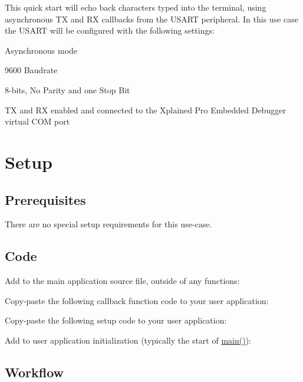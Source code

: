 This quick start will echo back characters typed into the terminal, using asynchronous TX and RX callbacks from the U\+S\+A\+RT peripheral. In this use case the U\+S\+A\+RT will be configured with the following settings\+:
\begin{DoxyItemize}
\item Asynchronous mode
\item 9600 Baudrate
\item 8-\/bits, No Parity and one Stop Bit
\item TX and RX enabled and connected to the Xplained Pro Embedded Debugger virtual C\+OM port
\end{DoxyItemize}\hypertarget{asfdoc_sam0_sercom_usart_callback_use_case_asfdoc_sam0_sercom_usart_callback_use_case_setup}{}\section{Setup}\label{asfdoc_sam0_sercom_usart_callback_use_case_asfdoc_sam0_sercom_usart_callback_use_case_setup}
\hypertarget{asfdoc_sam0_sercom_usart_callback_use_case_asfdoc_sam0_sercom_usart_callback_use_case_prereq}{}\subsection{Prerequisites}\label{asfdoc_sam0_sercom_usart_callback_use_case_asfdoc_sam0_sercom_usart_callback_use_case_prereq}
There are no special setup requirements for this use-\/case.\hypertarget{asfdoc_sam0_sercom_usart_callback_use_case_asfdoc_sam0_usart_callback_use_case_setup_code}{}\subsection{Code}\label{asfdoc_sam0_sercom_usart_callback_use_case_asfdoc_sam0_usart_callback_use_case_setup_code}
Add to the main application source file, outside of any functions\+: 
\begin{DoxyCodeInclude}{0}
\end{DoxyCodeInclude}

\begin{DoxyCodeInclude}{0}
\end{DoxyCodeInclude}
 Copy-\/paste the following callback function code to your user application\+: 
\begin{DoxyCodeInclude}{0}
\end{DoxyCodeInclude}
 Copy-\/paste the following setup code to your user application\+: 
\begin{DoxyCodeInclude}{0}
\end{DoxyCodeInclude}
 Add to user application initialization (typically the start of {\ttfamily \mbox{\hyperlink{csc__app_8c_a840291bc02cba5474a4cb46a9b9566fe}{main()}}})\+: 
\begin{DoxyCodeInclude}{0}
\end{DoxyCodeInclude}
 \hypertarget{asfdoc_sam0_sercom_usart_callback_use_case_asfdoc_sam0_usart_callback_use_case_setup_flow}{}\subsection{Workflow}\label{asfdoc_sam0_sercom_usart_callback_use_case_asfdoc_sam0_usart_callback_use_case_setup_flow}


